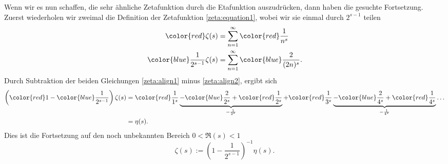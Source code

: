 Wenn wir es nun schaffen, die sehr ähnliche Zetafunktion durch die Etafunktion auszudrücken, dann haben die gesuchte Fortsetzung.
Zuerst wiederholen wir zweimal die Definition der Zetafunktion \eqref{zeta:equation1}, wobei wir sie einmal durch $2^{s-1}$ teilen
\begin{align}
    \color{red}
        \zeta(s)
    &=
    \sum_{n=1}^{\infty}
    \color{red}
        \frac{1}{n^s} \label{zeta:align1}
    \\
    \color{blue}
        \frac{1}{2^{s-1}}
        \zeta(s)
    &=
    \sum_{n=1}^{\infty}
    \color{blue}
        \frac{2}{(2n)^s}. \label{zeta:align2}
\end{align}
Durch Subtraktion der beiden Gleichungen \eqref{zeta:align1} minus \eqref{zeta:align2}, ergibt sich
\begin{align}
    \left({\color{red}1} - {\color{blue}\frac{1}{2^{s-1}}} \right)
    \zeta(s)
    &=
    {\color{red}\frac{1}{1^s}}
    \underbrace{
    -
    {\color{blue}\frac{2}{2^s}}
    +
    {\color{red}\frac{1}{2^s}}
    }_{-\frac{1}{2^s}}
    +
    {\color{red}\frac{1}{3^s}}
    \underbrace{-
    {\color{blue}\frac{2}{4^s}}
    +
    {\color{red}\frac{1}{4^s}}
    }_{-\frac{1}{4^s}}
    \ldots
    \\
    &= \eta(s).
\end{align}
Dies ist die Fortsetzung auf den noch unbekannten Bereich $0 < \Re(s) < 1$
\begin{equation} \label{zeta:equation:fortsetzung1}
    \zeta(s)
    :=
    \left(1 - \frac{1}{2^{s-1}} \right)^{-1} \eta(s).
\end{equation}

